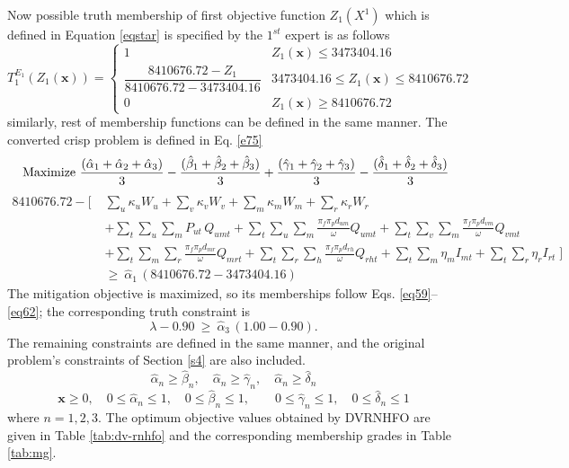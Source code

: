 \documentclass[a4paper]{elsarticle}
\begin{document}
{Now possible truth membership of first objective function $Z_1(X^1)$ which is defined in Equation \ref{eqstar} is specified by the $1^{st}$ expert is as follows
\begin{equation}
T_1^{E_1}(Z_1(\mathbf{x})) = \left\{
\begin{array}{ll}
1 & Z_1(\mathbf{x}) \leq 3473404.16 \\[4pt]
\dfrac{8410676.72 - Z_1}{8410676.72 - 3473404.16} & 3473404.16 \leq Z_1(\mathbf{x}) \leq 8410676.72 \\[6pt]
0 & Z_1(\mathbf{x}) \geq 8410676.72
\end{array}
\right.
\label{eqstar}
\end{equation}
similarly, rest of membership functions can be defined in the same manner.
The converted crisp problem is defined in Eq. \ref{e75}
$$\text{ Maximize }\frac{(\hat{\alpha}_1+\hat{\alpha}_2+\hat{\alpha}_3)}{3}-\frac{(\hat{\beta}_1+\hat{\beta}_2+\hat{\beta}_3)}{3}+\\ \frac{(\hat{\gamma}_1+\hat{\gamma}_2+\hat{\gamma}_3)}{3}-\frac{(\hat{\delta}_1+\hat{\delta}_2+\hat{\delta}_3)}{3}$$
\begin{equation}
\label{e75}
\begin{split}
8410676.72 - \Bigg[\;
& \sum_{u}\kappa_u W_u + \sum_{v}\kappa_v W_v + \sum_{m}\kappa_m W_m + \sum_{r}\kappa_r W_r \\
& + \sum_{t}\sum_{u}\sum_{m} P_{ut}\, Q_{umt}
  + \sum_{t}\sum_{u}\sum_{m}\frac{\pi_f \pi_p d_{um}}{\omega}Q_{umt}
  + \sum_{t}\sum_{v}\sum_{m}\frac{\pi_f \pi_p d_{vm}}{\omega}Q_{vmt} \\
& + \sum_{t}\sum_{m}\sum_{r}\frac{\pi_f \pi_p d_{mr}}{\omega}Q_{mrt}
  + \sum_{t}\sum_{r}\sum_{h}\frac{\pi_f \pi_p d_{rh}}{\omega}Q_{rht}
  + \sum_{t}\sum_{m}\eta_m I_{mt} + \sum_{t}\sum_{r}\eta_r I_{rt}
\;\Bigg] \\
& \geq\ \hat{\alpha}_1\,(8410676.72 - 3473404.16)
\end{split}
\end{equation}
The mitigation objective is maximized, so its memberships follow Eqs. \ref{eq59}--\ref{eq62}; the corresponding truth constraint is
\begin{equation}
\label{e75b}
\lambda - 0.90 \ \geq\ \hat{\alpha}_3\,(1.00-0.90).
\end{equation}
The remaining constraints are defined in the same manner, and the original problem's constraints of Section \ref{s4} are also included.\\
$$\hat{\alpha}_n\geq \hat{\beta}_n, \quad \hat{\alpha}_n\geq \hat{\gamma}_n, \quad \hat{\alpha}_n\geq\hat{\delta}_n$$
$$\mathbf{x}\geq 0,\quad 0\leq \hat{\alpha}_n \leq 1,\quad  0\leq \hat{\beta}_n \leq 1, \qquad  0\leq \hat{\gamma}_n \leq 1,\quad 0\leq \hat{\delta}_n \leq 1$$
where $n=1,2,3$.
The optimum objective values obtained by DVRNHFO are given in Table \ref{tab:dv-rnhfo} and the corresponding membership grades in Table \ref{tab:mg}.
}
\end{document}
